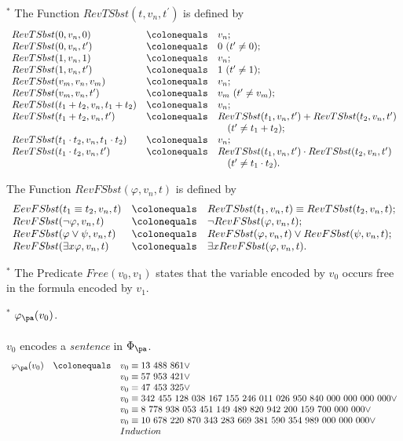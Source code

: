 \item$^*$ The Function $RevTSbst (t, v_n, t^\prime)$ is defined by
\[
\begin{array}{lll}
RevTSbst(0, v_n, 0) & \colonequals & v_n; \cr
RevTSbst(0, v_n, t^\prime ) & \colonequals & 0 \ (t^\prime \neq 0);\cr
RevTSbst(1, v_n, 1) & \colonequals & v_n; \cr
RevTSbst(1, v_n, t^\prime ) & \colonequals & 1 \ (t^\prime \neq 1);\cr
RevTSbst(v_m, v_n, v_m) & \colonequals & v_n; \cr
RevTSbst(v_m, v_n, t^\prime) & \colonequals & v_m \ (t^\prime \neq v_m);\cr
RevTSbst(t_1 + t_2, v_n, t_1 + t_2) & \colonequals & v_n; \cr
RevTSbst(t_1 + t_2, v_n, t^\prime ) & \colonequals & RevTSbst(t_1, v_n, t^\prime ) + RevTSbst(t_2, v_n, t^\prime ) \cr
\ & \ & \ \ \ (t^\prime \neq t_1 + t_2);\cr
RevTSbst(t_1 \cdot t_2, v_n, t_1 \cdot t_2) & \colonequals & v_n; \cr
RevTSbst(t_1 \cdot t_2, v_n, t^\prime ) & \colonequals & RevTSbst(t_1, v_n, t^\prime ) \cdot RevTSbst(t_2, v_n, t^\prime ) \cr
\ & \ & \ \ \ (t^\prime \neq t_1 \cdot t_2).
\end{array} 
\]
%
\item The Function $RevFSbst(\varphi, v_n, t)$ is defined by
\[
\begin{array}{lll}
EevFSbst(t_1 \equiv t_2, v_n, t) & \colonequals & RevTSbst(t_1, v_n, t) \equiv RevTSbst(t_2, v_n, t);\cr
RevFSbst(\neg\varphi, v_n, t) & \colonequals & \neg RevFSbst(\varphi, v_n, t);\cr
RevFSbst(\varphi \lor \psi, v_n, t) & \colonequals & RevFSbst(\varphi, v_n, t) \lor RevFSbst(\psi, v_n, t);\cr
RevFSbst(\exists x \varphi, v_n, t) & \colonequals & \exists x RevFSbst(\varphi, v_n, t).
\end{array}
\]
%
\item$^*$ The Predicate $Free (v_0, v_1)$ states that the variable encoded by $v_0$ occurs free in the formula encoded by $v_1$.
%
\item$^*$ $\varphi_\pa(v_0)$.\\
\ \\
$v_0$ encodes a \emph{sentence} in $\Phi_\pa$.
\[
\begin{array}{lll}
\varphi_\pa(v_0) & \colonequals & v_0 \equiv 13\ 488\ 861 \lor\cr
\ & \ & v_0 \equiv 57\ 953\ 421 \lor\cr
\ & \ & v_0 \equiv 47\ 453\ 325 \lor\cr
\ & \ & v_0 \equiv 342\ 455\ 128\ 038\ 167\ 155\ 246\ 011\ 026\ 950\ 840\ 000\ 000\ 000\ 000 \lor\cr
\ & \ & v_0 \equiv 8\ 778\ 938\ 053\ 451\ 149\ 489\ 820\ 942\ 200\ 159\ 700\ 000\ 000 \lor\cr
\ & \ & v_0 \equiv 10\ 678\ 220\ 870\ 343\ 283\ 669\ 381\ 590\ 354\ 989\ 000\ 000\ 000 \lor\cr
\ & \ & Induction
\end{array}
\]
